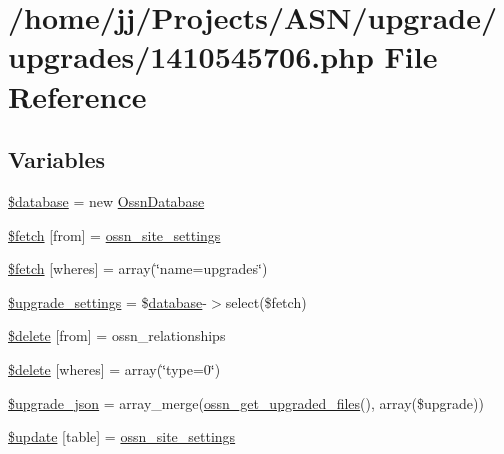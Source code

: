 \hypertarget{1410545706_8php}{}\section{/home/jj/\+Projects/\+A\+S\+N/upgrade/upgrades/1410545706.php File Reference}
\label{1410545706_8php}
\subsection*{Variables}
\begin{DoxyCompactItemize}
\item 
\hyperlink{1410545706_8php_a7691c0162d89de0b6ba47edcd8ba8878}{\$database} = new \hyperlink{class_ossn_database}{Ossn\+Database}
\item 
\hyperlink{1410545706_8php_abbaa0ea36be5869d572c40498afa2bd6}{\$fetch} \mbox{[}\textquotesingle{}from\textquotesingle{}\mbox{]} = \textquotesingle{}\hyperlink{ossn_8lib_8system_8php_a610e2045b8a86c09f777b4d82e24e34c}{ossn\+\_\+site\+\_\+settings}\textquotesingle{}
\item 
\hyperlink{1410545706_8php_ac72c925d8ad9ab6b9bf7c7a1401230bb}{\$fetch} \mbox{[}\textquotesingle{}wheres\textquotesingle{}\mbox{]} = array(\char`\"{}name=\textquotesingle{}upgrades\textquotesingle{}\char`\"{})
\item 
\hyperlink{1410545706_8php_ad6ac3063be110b760bc79cfecd54cb1a}{\$upgrade\+\_\+settings} = \$\hyperlink{ossn_8config_8db_8example_8php_a4e0ca996705612048240f76ff8d4da95}{database}-\/$>$select(\$fetch)
\item 
\hyperlink{1410545706_8php_ac228c31a229875fce5416792b17c9eee}{\$delete} \mbox{[}\textquotesingle{}from\textquotesingle{}\mbox{]} = \textquotesingle{}ossn\+\_\+relationships\textquotesingle{}
\item 
\hyperlink{1410545706_8php_a9bef9b9c519ccfae44ff986580419667}{\$delete} \mbox{[}\textquotesingle{}wheres\textquotesingle{}\mbox{]} = array(\char`\"{}type=\textquotesingle{}0\textquotesingle{}\char`\"{})
\item 
\hyperlink{1410545706_8php_a512525d0f5eb608ac72ca7b85e5fbf65}{\$upgrade\+\_\+json} = array\+\_\+merge(\hyperlink{ossn_8lib_8upgrade_8php_a984d0f1ee4273d739939d28d00a8bedb}{ossn\+\_\+get\+\_\+upgraded\+\_\+files}(), array(\$upgrade))
\item 
\hyperlink{1410545706_8php_aee7ba5985ddf023a93862ab77e9718f9}{\$update} \mbox{[}\textquotesingle{}table\textquotesingle{}\mbox{]} = \textquotesingle{}\hyperlink{ossn_8lib_8system_8php_a610e2045b8a86c09f777b4d82e24e34c}{ossn\+\_\+site\+\_\+settings}\textquotesingle{}

\end{DoxyCompactItemize}
